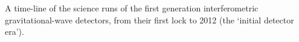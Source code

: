 \label{figure:runtimes}
A time-line of the science runs of the first generation interferometric gravitational-wave detectors, from their first lock to 2012 (the `initial detector era').
